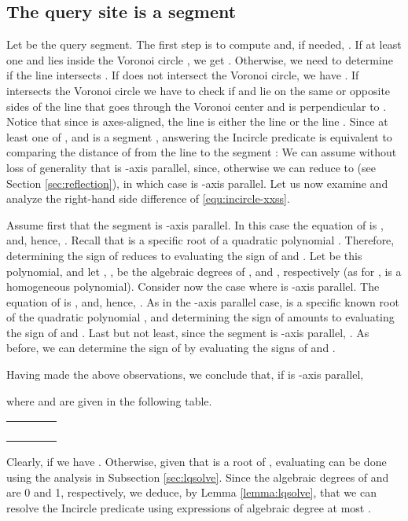 \documentclass[letterpaper,11pt]{article}
\newcommand{\incircle}{\textsf{Incircle}\xspace}
\newcommand{\vor}{Voronoi\xspace}
\begin{document}
{\subsection{The query site is a segment}\label{sec:pxss}

Let  be the query segment. The first step is to compute
 and, if needed,
. If at least one  and  lies inside
the \vor circle , we get
. Otherwise, we need to determine if the
line  intersects . If  does not
intersect the \vor circle, we have . If
 intersects the \vor circle we have to check if  and 
lie on the same or opposite sides of the line  that
goes through the \vor center  and is perpendicular to
. Notice that since  is axes-aligned, the line
 is either the line  or the line .
Since at least one of ,  and  is a segment ,
answering the \incircle predicate is equivalent to comparing the
distance of  from the line  to the segment : 
We can assume without loss of generality that  is
-axis parallel, since, otherwise we can reduce
 to
  (see Section
\ref{sec:reflection}), in which case  is -axis parallel.
Let us now examine and analyze the right-hand side difference of
\eqref{equ:incircle-xxss}.

Assume first that the segment  is -axis parallel. In this case the
equation of  is , and, hence,
. Recall that  is a specific root of a
quadratic polynomial . Therefore, determining the sign of
 reduces to evaluating the sign of  and .
Let  be this polynomial, and let ,
,  be the algebraic degrees of ,  and
, respectively (as for ,  is a homogeneous polynomial).
Consider now the case where  is -axis parallel. The equation of
 is , and, hence, . As in
the -axis parallel case,  is a specific known root of the 
quadratic polynomial , and determining the sign of 
amounts to evaluating the sign of  and . 
Last but not least, since the segment  is -axis parallel,
. As before, we can determine the sign of 
by evaluating the signs of  and .

Having made the above observations, we conclude that, if  is
-axis parallel,

where  and  are given in the following table.
\begin{center}
\begin{tabular}{|c|c|c|c|}\hline 
    &&&\\\hline\hline
    \multirow{2}{*}{}&&&\\\cline{2-4}
    &&&\\\hline
    \multirow{2}{*}{}&&&\\\cline{2-4}
    &&&\\\hline 
  \end{tabular}
\end{center}
Clearly, if  we have
. Otherwise,
given that  is a root of , evaluating
 can be done using the analysis in
Subsection \ref{sec:lqsolve}. Since the algebraic degrees of  and
 are 0 and 1, respectively, we deduce, by Lemma
\ref{lemma:lqsolve}, that we can resolve the \incircle predicate using
expressions of algebraic degree at most
.

}
\end{document}
